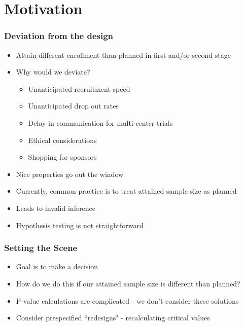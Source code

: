 \documentclass{beamer}\usepackage[]{graphicx}\usepackage[]{color}
\begin{document}
\section{Motivation}

\begin{frame}
\frametitle{Deviation from the design}
    \begin{itemize}
        \item Attain different enrollment than planned in first and/or second stage
        \item Why would we deviate?
          \begin{itemize}
            \item Unanticipated recruitment speed
            \item Unanticipated drop out rates
            \item Delay in communication for multi-center trials
            \item Ethical considerations
            \item Shopping for sponsors
          \end{itemize}
        \item Nice properties go out the window
        \item Currently, common practice is to treat attained sample size as planned
        \item Leads to invalid inference
        \item Hypothesis testing is not straightforward
    \end{itemize}
\end{frame}

\begin{frame}
\frametitle{Setting the Scene}
    \begin{itemize}
        \item Goal is to make a decision
        \item How do we do this if our attained sample size is different than planned?
        \item P-value calculations are complicated - we don't consider these solutions
        \item Consider prespecified ``redesigns" - recalculating critical values
    \end{itemize}
\end{frame}
\end{document}
